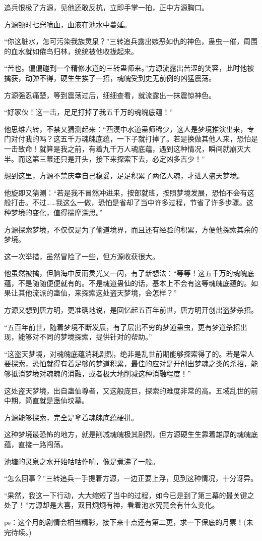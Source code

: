 \begin{this_body}
追兵恨极了方源，见他还敢反抗，立即手掌一拍，正中方源胸口。

方源顿时七窍喷血，血液在池水中蔓延。

“你这脏水，怎可污染我族灵泉？”三转追兵露出嫉恶如仇的神色，蛊虫一催，周围的血水就如倦鸟归林，统统被他收拢起来。

“苦也。偏偏碰到一个精修水道的三转蛊师来。”方源流露出苦涩的笑容，此时他被擒获，动弹不得，硬生生挨了一招，魂魄受到史无前例的凶猛震荡。

方源强忍痛楚，等到震荡过后，细细查看，就流露出一抹震惊神色。

“好家伙！这一击，足足打掉了我五千万的魂魄底蕴！”

他思维六转，不禁又猜测起来：“西漠中水道蛊师稀少，这人是梦境推演出来，专门对付我的吗？这五千万魂魄底蕴，一下子就打掉了。若是换做其他人来，恐怕是一击致命！就算是我之前，有着九千万人魂底蕴，遇到这种情况，瞬间就崩灭大半。而这第三幕还只是开头，接下来探索下去，必定凶多吉少！”

想到这里，方源不禁庆幸自己稳妥，足足积累了两亿人魂，才进入盗天梦境。

他旋即又猜测：“若是我不冒然冲进来，按部就班，按照梦境发展，恐怕不会有这般打击。不过……我这么一做，恐怕是省却了当中许多过程，节省了许多步骤。这种梦境的变化，值得揣摩深思。”

方源探索梦境，不仅仅是为了偷道境界，而且还有经验的积累，方便他探索其余的梦境。

这一次举措，虽然冒险了一些，但方源收获很大。

他虽然被擒，但脑海中反而灵光又一闪，有了新想法：“等等！这五千万的魂魄底蕴，不是随随便便就有的。不是魂道蛊仙的话，基本上不会有这等魂魄底蕴的。如果让其他流派的蛊仙，来探索这处盗天梦境，会怎样？”

方源又想到唐方明，更准确地说，是回忆起五百年前世，唐方明开创出盗梦杀招。

“五百年前世，随着梦境不断发展，有了层出不穷的梦道蛊虫，更有梦道杀招出现，能够对不同的梦境探索，提供针对的帮助。”

“这盗天梦境，对魂魄底蕴消耗剧烈，绝非是乱世前期能够探索得了的。若是常人要探索，恐怕就得有着足够的梦道积累，最佳的应对是开创出梦魂之类的杀招，能够抵消梦境对魂魄的消融，或者极大地削减这种消融程度！”

这处盗天梦境，出自蛊仙尊者，又这般庞巨，探索的难度非常的高。五域乱世的前中期，简直就是蛊仙坟墓。

方源能够探索，完全是拿着魂魄底蕴硬拼。

这种梦境最恐怖的地方，就是削减魂魄极其剧烈，但方源硬生生靠着雄厚的魂魄底蕴，直接一路闯荡。

池塘的灵泉之水开始咕咕作响，像是煮沸了一般。

“怎么回事？”三转追兵一手提着方源，一边正要上浮，见到这种情况，十分讶异。

“果然，我这一下行动，大大缩短了当中的过程，如今已是到了第三幕的最关键之处了！”方源却是大喜，双目炯炯有神，看着池水究竟会有什么变化。

ps：这个月的剧情会相当精彩，接下来十点还有第二更，求一下保底的月票！(未完待续。)

\end{this_body}

